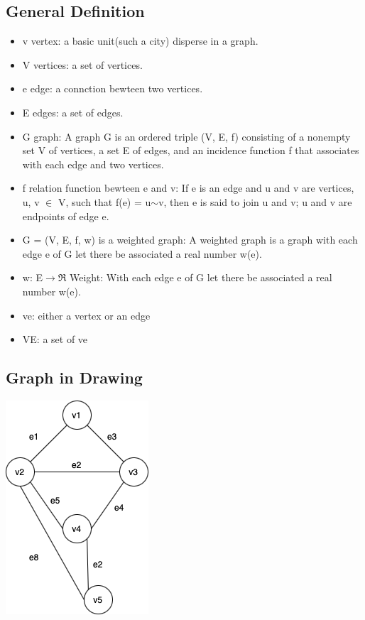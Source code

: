 \documentclass[12pt]{article}
\begin{document}
\subsection{General Definition}
\begin{itemize}
    \item v vertex: a basic unit(such a city) disperse in a graph.
    \item V vertices: a set of vertices.
    \item e edge: a connction bewteen two vertices.
    \item E edges: a set of edges.
    \item G graph: A graph G is an ordered triple (V, E, f) consisting of a nonempty set V of vertices, 
    a set E of edges, and an incidence function f that associates with each edge and two vertices.
    \item f relation function bewteen e and v: If e is an edge and u and v are vertices, 
    u, v $\in$  V, such that f(e) = u$\sim$v, then e is said to join u and v; u and v are endpoints of edge e.     
    \item G = (V, E, f, w) is a weighted graph: A weighted graph is a graph with each edge e of G let there be associated a real number w(e).
    \item w: E$\rightarrow\Re$ Weight: With each edge e of G let there be associated a real number w(e).
    \item ve: either a vertex or an edge
    \item VE: a set of ve
\end{itemize}

\subsection{Graph in Drawing}
\includegraphics[scale=0.5]{graph.png}
\end{document}
